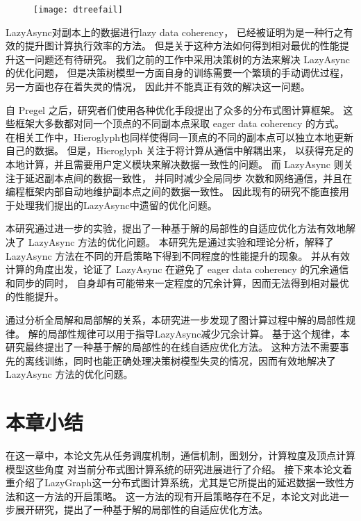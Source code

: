 \begin{figure}[!htbp]
\centering
\texttt{[image: dtreefail]}
\label{fig:dtfail}
\end{figure}

LazyAsync对副本上的数据进行lazy data coherency，
已经被证明为是一种行之有效的提升图计算执行效率的方法。
但是关于这种方法如何得到相对最优的性能提升这一问题还有待研究。
我们之前的工作中采用决策树的方法来解决 LazyAsync 的优化问题，
但是决策树模型一方面自身的训练需要一个繁琐的手动调优过程，另一方面也存在着失灵的情况，
因此并不能真正有效的解决这一问题。


自 Pregel 之后，研究者们使用各种优化手段提出了众多的分布式图计算框架。
这些框架大多数都对同一个顶点的不同副本点采取 eager data coherency 的方式。
在相关工作中，Hieroglyph\cite{ju2017hieroglyph}也同样使得同一顶点的不同的副本点可以独立本地更新自己的数据。
但是，Hieroglyph 关注于将计算从通信中解耦出来， 以获得充足的本地计算，并且需要用户定义模块来解决数据一致性的问题。
而 LazyAsync 则关注于延迟副本点间的数据一致性， 并同时减少全局同步 次数和网络通信，并且在编程框架内部自动地维护副本点之间的数据一致性。 
因此现有的研究不能直接用于处理我们提出的LazyAsync中遗留的优化问题。


本研究通过进一步的实验，提出了一种基于解的局部性的自适应优化方法有效地解决了 LazyAsync 方法的优化问题。
本研究先是通过实验和理论分析，解释了LazyAsync 方法在不同的开启策略下得到不同程度的性能提升的现象。
并从有效计算的角度出发，论证了 LazyAsync 在避免了 eager data coherency 的冗余通信和同步的同时，
自身却有可能带来一定程度的冗余计算，因而无法得到相对最优的性能提升。

通过分析全局解和局部解的关系，本研究进一步发现了图计算过程中解的局部性规律。
解的局部性规律可以用于指导LazyAsync减少冗余计算。
基于这个规律，本研究最终提出了一种基于解的局部性的在线自适应优化方法。
这种方法不需要事先的离线训练，同时也能正确处理决策树模型失灵的情况，因而有效地解决了
LazyAsync 方法的优化问题。

\section{本章小结}
在这一章中，本论文先从任务调度机制，通信机制，图划分，计算粒度及顶点计算模型这些角度
对当前分布式图计算系统的研究进展进行了介绍。
接下来本论文着重介绍了LazyGraph这一分布式图计算系统，尤其是它所提出的延迟数据一致性方法和这一方法的开启策略。
这一方法的现有开启策略存在不足，本论文对此进一步展开研究，提出了一种基于解的局部性的自适应优化方法。